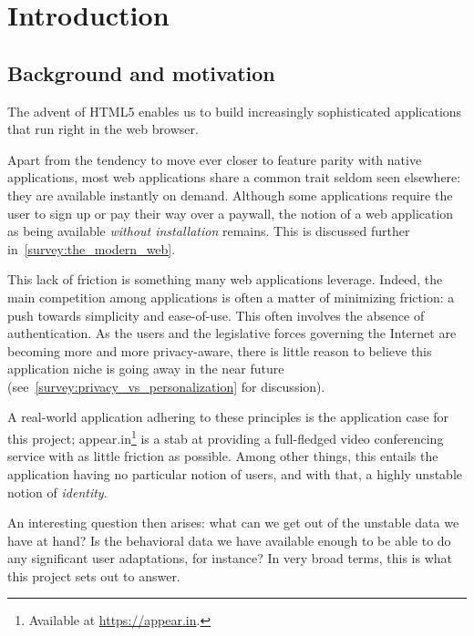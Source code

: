 \chapter{Introduction}

\label{Chapter1}


\section{Background and motivation}
\label{intro:background_and_motivation}

  The advent of HTML5 enables us to build increasingly sophisticated applications that run right in the web browser.

  Apart from the tendency to move ever closer to feature parity with native applications, most web applications share a common trait seldom seen elsewhere: they are available instantly on demand. Although some applications require the user to sign up or pay their way over a paywall, the notion of a web application as being available \emph{without installation} remains. This is discussed further in~\ref{survey:the_modern_web}.

  This lack of friction is something many web applications leverage. Indeed, the main competition among applications is often a matter of minimizing friction: a push towards simplicity and ease-of-use. This often involves the absence of authentication. As the users and the legislative forces governing the Internet are becoming more and more privacy-aware, there is little reason to believe this application niche is going away in the near future (see~\ref{survey:privacy_vs_personalization} for discussion).

  A real-world application adhering to these principles is the application case for this project; appear.in\footnote{Available at \url{https://appear.in}.} is a stab at providing a full-fledged video conferencing service with as little friction as possible. Among other things, this entails the application having no particular notion of users, and with that, a highly unstable notion of \emph{identity}.

  An interesting question then arises: what can we get out of the unstable data we have at hand? Is the behavioral data we have available enough to be able to do any significant user adaptations, for instance? In very broad terms, this is what this project sets out to answer.


